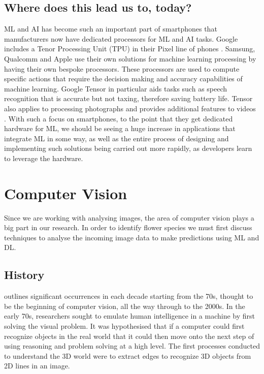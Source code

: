 \documentclass[12pt,a4paper]{report}
\begin{document}
\subsection{Where does this lead us to, today?}

ML and AI has become such an important part of smartphones that manufacturers now have dedicated processors for ML and 
AI tasks. Google includes a Tenor Processing Unit (TPU) in their Pixel line of phones \citep{triggs2021}. Samsung, 
Qualcomm and Apple use their own solutions for machine learning processing by having their own bespoke processors. These 
processors are used to compute specific actions that require the decision making and accuracy capabilities of machine 
learning. Google Tensor in particular aids tasks such as speech recognition that is accurate but not taxing, therefore 
saving battery life. Tensor also applies to processing photographs and provides additional features to videos 
\citep{gupta2021}. With such a focus on smartphones, to the point that they get dedicated hardware for ML, we should be 
seeing a huge increase in applications that integrate ML in some way, as well as the entire process of designing and 
implementing such solutions being carried out more rapidly, as developers learn to leverage the hardware.

\section{Computer Vision}

Since we are working with analysing images, the area of computer vision plays a big part in our research. In order to 
identify flower species we must first discuss techniques to analyse the incoming image data to make predictions using
ML and DL.

\subsection{History}

\citet{SzeliskiRichard2011CV:A} outlines significant occurrences in each decade starting from the 70s, 
thought to be the beginning of computer vision, all the way through to the 2000s. In the early 70s, researchers sought 
to emulate human intelligence in a machine by first solving the visual problem. It was hypothesised that if a computer 
could first recognize objects in the real world that it could then move onto the next step of using reasoning and 
problem solving at a high level. The first processes conducted to understand the 3D world were to extract edges to 
recognize 3D objects from 2D lines in an image.
\end{document}
